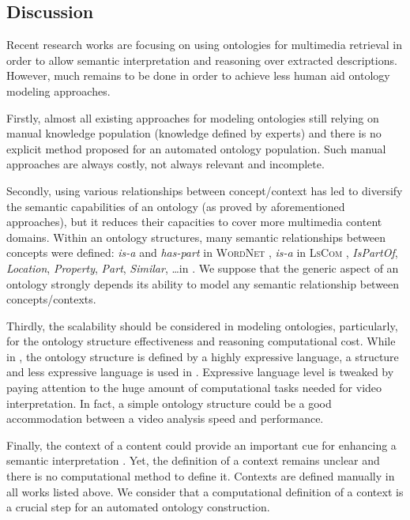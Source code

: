 		\subsection{Discussion}

		Recent research works are focusing on using ontologies for multimedia retrieval in order to allow
		semantic interpretation and reasoning over extracted descriptions. However, much remains to 
		be done in order to achieve less human aid ontology modeling approaches.

		Firstly, almost all existing approaches for modeling ontologies still relying on manual 
		knowledge population (knowledge defined by experts) and there is no explicit method 
		proposed for an automated ontology population. Such manual approaches are always costly, 
		not always relevant and incomplete.

		Secondly, using various relationships between concept/context has led to diversify the 
		semantic capabilities of an ontology (as proved by aforementioned approaches), 
		but it reduces their capacities to cover more multimedia content domains. Within
		an ontology structures, many semantic relationships between concepts were defined:
		 \emph{is-a} 	and \emph{has-part} in \textsc{WordNet} \citep{Fellbaum2010}, 
		\emph{is-a} in \textsc{LsCom} \citep{lscom2006}, \emph{IsPartOf}, \emph{Location}, 
		\emph{Property}, \emph{Part}, \emph{Similar}, 	\dots in \citep{Mylonas2008,Mylonas2009}. 
		We suppose that the generic aspect of an ontology strongly depends  its ability to model 
		any semantic relationship between concepts/contexts. 

		Thirdly, the scalability should be considered in modeling ontologies, particularly, 
		for the ontology structure effectiveness and reasoning computational cost. While in 
		\citep{Simou2008,Hudelot2010,Paliouras2011,Bannour2014}, the ontology structure is 
		defined by a highly expressive language, a  structure and less expressive 
		language is used in  \citep{lscom2006,Vallet2007,Mylonas2008,Mylonas2009,Fellbaum2010}.
		Expressive language level is tweaked by paying attention to the huge amount of 
		computational tasks needed for video interpretation. In fact, a simple ontology structure 
		could be a good accommodation between a video analysis speed and performance.

		Finally, the context of a content could provide an important cue for enhancing a semantic
		interpretation \citep{Fauzi2014}.  Yet, the definition of a context remains unclear and there 
		is no computational method to define it. Contexts are defined manually in all works 	
		listed above. We consider that a computational definition of a context is a crucial 
		step for an automated ontology construction.

